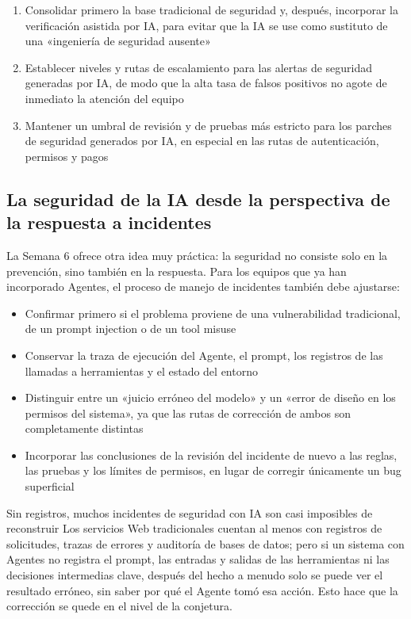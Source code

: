 \documentclass[a4paper]{article}
\begin{document}
\begin{enumerate}
    \item Consolidar primero la base tradicional de seguridad y, después, incorporar la verificación asistida por IA, para evitar que la IA se use como sustituto de una «ingeniería de seguridad ausente»
    \item Establecer niveles y rutas de escalamiento para las alertas de seguridad generadas por IA, de modo que la alta tasa de falsos positivos no agote de inmediato la atención del equipo
    \item Mantener un umbral de revisión y de pruebas más estricto para los parches de seguridad generados por IA, en especial en las rutas de autenticación, permisos y pagos
\end{enumerate}

\subsection{La seguridad de la IA desde la perspectiva de la respuesta a incidentes}

La Semana 6 ofrece otra idea muy práctica: la seguridad no consiste solo en la prevención, sino también en la respuesta. Para los equipos que ya han incorporado Agentes, el proceso de manejo de incidentes también debe ajustarse:

\begin{itemize}
    \item Confirmar primero si el problema proviene de una vulnerabilidad tradicional, de un prompt injection o de un tool misuse
    \item Conservar la traza de ejecución del Agente, el prompt, los registros de las llamadas a herramientas y el estado del entorno
    \item Distinguir entre un «juicio erróneo del modelo» y un «error de diseño en los permisos del sistema», ya que las rutas de corrección de ambos son completamente distintas
    \item Incorporar las conclusiones de la revisión del incidente de nuevo a las reglas, las pruebas y los límites de permisos, en lugar de corregir únicamente un bug superficial
\end{itemize}

\begin{warningbox}{Sin registros, muchos incidentes de seguridad con IA son casi imposibles de reconstruir}
Los servicios Web tradicionales cuentan al menos con registros de solicitudes, trazas de errores y auditoría de bases de datos; pero si un sistema con Agentes no registra el prompt, las entradas y salidas de las herramientas ni las decisiones intermedias clave, después del hecho a menudo solo se puede ver el resultado erróneo, sin saber por qué el Agente tomó esa acción. Esto hace que la corrección se quede en el nivel de la conjetura.
\end{warningbox}
\end{document}
